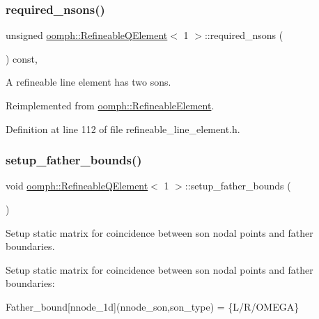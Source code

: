 \subsubsection{\texorpdfstring{required\+\_\+nsons()}{required\_nsons()}}
{\footnotesize\ttfamily unsigned \hyperlink{classoomph_1_1RefineableQElement}{oomph\+::\+Refineable\+Q\+Element}$<$ 1 $>$\+::required\+\_\+nsons (\begin{DoxyParamCaption}{ }\end{DoxyParamCaption}) const\hspace{0.3cm}{\ttfamily [inline]}, {\ttfamily [virtual]}}



A refineable line element has two sons. 



Reimplemented from \hyperlink{classoomph_1_1RefineableElement_a9761852271f6cc9a1a0552ad7e054e4b}{oomph\+::\+Refineable\+Element}.



Definition at line 112 of file refineable\+\_\+line\+\_\+element.\+h.

\mbox{\label{classoomph_1_1RefineableQElement_3_011_01_4_af45c2d218e992dc0d516015762e6db69}} 
\subsubsection{\texorpdfstring{setup\+\_\+father\+\_\+bounds()}{setup\_father\_bounds()}}
{\footnotesize\ttfamily void \hyperlink{classoomph_1_1RefineableQElement}{oomph\+::\+Refineable\+Q\+Element}$<$ 1 $>$\+::setup\+\_\+father\+\_\+bounds (\begin{DoxyParamCaption}{ }\end{DoxyParamCaption})\hspace{0.3cm}{\ttfamily [protected]}}



Setup static matrix for coincidence between son nodal points and father boundaries. 

Setup static matrix for coincidence between son nodal points and father boundaries\+:

Father\+\_\+bound\mbox{[}nnode\+\_\+1d\mbox{]}(nnode\+\_\+son,son\+\_\+type) = \{L/\+R/\+O\+M\+E\+GA\}


